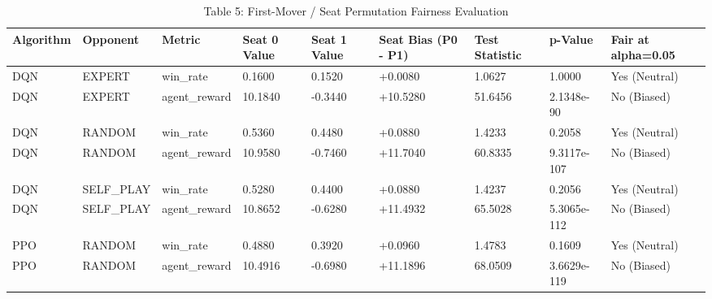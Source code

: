 \begin{table}
\caption{Table 5: First-Mover / Seat Permutation Fairness Evaluation}
\label{tab:table5_seat_fairness_analysis}
\begin{tabular}{lllllllll}
\toprule
Algorithm & Opponent & Metric & Seat 0 Value & Seat 1 Value & Seat Bias (P0 - P1) & Test Statistic & p-Value & Fair at alpha=0.05 \\
\midrule
DQN & EXPERT & win\_rate & 0.1600 & 0.1520 & +0.0080 & 1.0627 & 1.0000 & Yes (Neutral) \\
DQN & EXPERT & agent\_reward & 10.1840 & -0.3440 & +10.5280 & 51.6456 & 2.1348e-90 & No (Biased) \\
DQN & RANDOM & win\_rate & 0.5360 & 0.4480 & +0.0880 & 1.4233 & 0.2058 & Yes (Neutral) \\
DQN & RANDOM & agent\_reward & 10.9580 & -0.7460 & +11.7040 & 60.8335 & 9.3117e-107 & No (Biased) \\
DQN & SELF\_PLAY & win\_rate & 0.5280 & 0.4400 & +0.0880 & 1.4237 & 0.2056 & Yes (Neutral) \\
DQN & SELF\_PLAY & agent\_reward & 10.8652 & -0.6280 & +11.4932 & 65.5028 & 5.3065e-112 & No (Biased) \\
PPO & RANDOM & win\_rate & 0.4880 & 0.3920 & +0.0960 & 1.4783 & 0.1609 & Yes (Neutral) \\
PPO & RANDOM & agent\_reward & 10.4916 & -0.6980 & +11.1896 & 68.0509 & 3.6629e-119 & No (Biased) \\
\bottomrule
\end{tabular}
\end{table}
